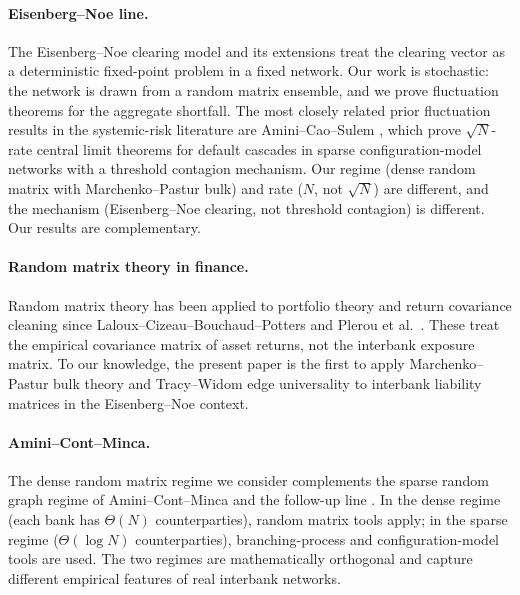 \documentclass[11pt,a4paper]{article}
\theoremstyle{definition}
\begin{document}
\paragraph{Eisenberg--Noe line.} The Eisenberg--Noe clearing model
\cite{EisenbergNoe2001} and its extensions \cite{Elsinger2009,RogersVeraart2013,
GlassermanYoung2015} treat the clearing vector as a deterministic fixed-point
problem in a fixed network. Our work is stochastic: the network is drawn from
a random matrix ensemble, and we prove fluctuation theorems for the aggregate
shortfall. The most closely related prior fluctuation results in the
systemic-risk literature are Amini--Cao--Sulem \cite{AminiCaoSulem2021,
AminiCaoSulem2024SIAM}, which prove $\sqrt N$-rate central limit theorems for
default cascades in sparse configuration-model networks with a threshold
contagion mechanism. Our regime (dense random matrix with Marchenko--Pastur
bulk) and rate ($N$, not $\sqrt N$) are different, and the mechanism
(Eisenberg--Noe clearing, not threshold contagion) is different. Our results
are complementary.

\paragraph{Random matrix theory in finance.} Random matrix theory has been
applied to portfolio theory and return covariance cleaning since
Laloux--Cizeau--Bouchaud--Potters \cite{LalouxCizeauBouchaudPotters1999} and
Plerou et al.\ \cite{PlerouEtAl2002}. These treat the empirical covariance
matrix of asset returns, not the interbank exposure matrix. To our knowledge,
the present paper is the first to apply Marchenko--Pastur bulk theory and
Tracy--Widom edge universality to interbank liability matrices in the
Eisenberg--Noe context.

\paragraph{Amini--Cont--Minca.} The dense random matrix regime we consider
complements the sparse random graph regime of Amini--Cont--Minca
\cite{AminiContMinca2016} and the follow-up line
\cite{DeteringEtAl2019,Hurd2023,BenelDeteringDemoulin2026}. In the dense
regime (each bank has $\Theta(N)$ counterparties), random matrix tools apply;
in the sparse regime ($\Theta(\log N)$ counterparties), branching-process and
configuration-model tools are used. The two regimes are mathematically
orthogonal and capture different empirical features of real interbank networks.
\end{document}
